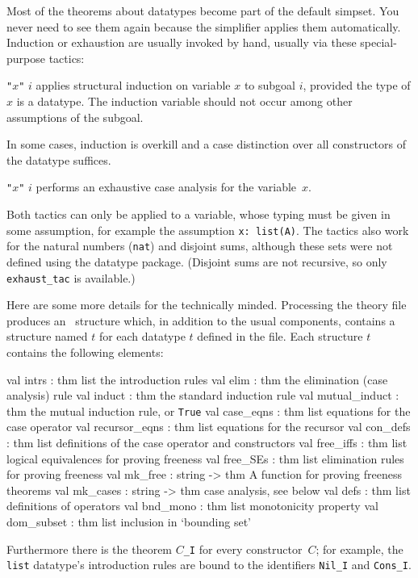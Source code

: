 Most of the theorems about datatypes become part of the default simpset.  You
never need to see them again because the simplifier applies them
automatically.  Induction or exhaustion are usually invoked by hand,
usually via these special-purpose tactics:
\begin{ttdescription}
\item[\ttindexbold{induct_tac} {\tt"}$x${\tt"} $i$] applies structural
  induction on variable $x$ to subgoal $i$, provided the type of $x$ is a
  datatype.  The induction variable should not occur among other assumptions
  of the subgoal.
\end{ttdescription}
In some cases, induction is overkill and a case distinction over all
constructors of the datatype suffices.
\begin{ttdescription}
\item[\ttindexbold{exhaust_tac} {\tt"}$x${\tt"} $i$]
 performs an exhaustive case analysis for the variable~$x$.
\end{ttdescription}

Both tactics can only be applied to a variable, whose typing must be given in
some assumption, for example the assumption \texttt{x:\ list(A)}.  The tactics
also work for the natural numbers (\texttt{nat}) and disjoint sums, although
these sets were not defined using the datatype package.  (Disjoint sums are
not recursive, so only \texttt{exhaust_tac} is available.)

\bigskip
Here are some more details for the technically minded.  Processing the
theory file produces an \ML\ structure which, in addition to the usual
components, contains a structure named $t$ for each datatype $t$ defined in
the file.  Each structure $t$ contains the following elements:
\begin{ttbox}
val intrs         : thm list  \textrm{the introduction rules}
val elim          : thm       \textrm{the elimination (case analysis) rule}
val induct        : thm       \textrm{the standard induction rule}
val mutual_induct : thm       \textrm{the mutual induction rule, or \texttt{True}}
val case_eqns     : thm list  \textrm{equations for the case operator}
val recursor_eqns : thm list  \textrm{equations for the recursor}
val con_defs      : thm list  \textrm{definitions of the case operator and constructors}
val free_iffs     : thm list  \textrm{logical equivalences for proving freeness}
val free_SEs      : thm list  \textrm{elimination rules for proving freeness}
val mk_free       : string -> thm  \textrm{A function for proving freeness theorems}
val mk_cases      : string -> thm  \textrm{case analysis, see below}
val defs          : thm list  \textrm{definitions of operators}
val bnd_mono      : thm list  \textrm{monotonicity property}
val dom_subset    : thm list  \textrm{inclusion in `bounding set'}
\end{ttbox}
Furthermore there is the theorem $C$\texttt{_I} for every constructor~$C$; for
example, the \texttt{list} datatype's introduction rules are bound to the
identifiers \texttt{Nil_I} and \texttt{Cons_I}.

